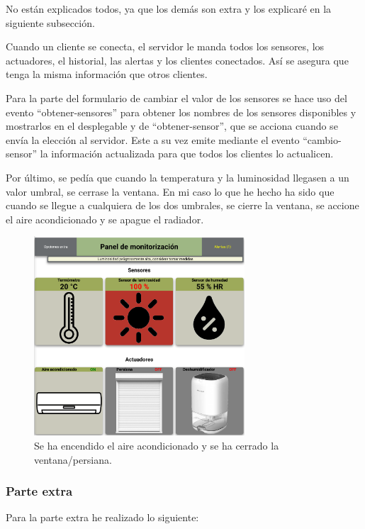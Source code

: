 \documentclass{article}
\begin{document}
No están explicados todos, ya que los demás son extra y los explicaré en la siguiente subsección.

Cuando un cliente se conecta, el servidor le manda todos los sensores, los actuadores, el historial, las alertas y los clientes conectados. Así se asegura que tenga la misma información que otros clientes.



Para la parte del formulario de cambiar el valor de los sensores se hace uso del evento ``obtener-sensores'' para obtener los nombres de los sensores disponibles y mostrarlos en el desplegable y de ``obtener-sensor'', que se acciona cuando se envía la elección al servidor. Este a su vez emite mediante el evento ``cambio-sensor'' la información actualizada para que todos los clientes lo actualicen.

Por último, se pedía que cuando la temperatura y la luminosidad llegasen a un valor umbral, se cerrase la ventana. En mi caso lo que he hecho ha sido que cuando se llegue a cualquiera de los dos umbrales, se cierre la ventana, se accione el aire acondicionado y se apague el radiador.

\begin{figure}[H]
    \centering
    \includegraphics[width=0.7\textwidth]{images/muchaluz.png}
    \caption{Se ha encendido el aire acondicionado y se ha cerrado la ventana/persiana.}
\end{figure}

\subsubsection{Parte extra}
Para la parte extra he realizado lo siguiente:
\end{document}
